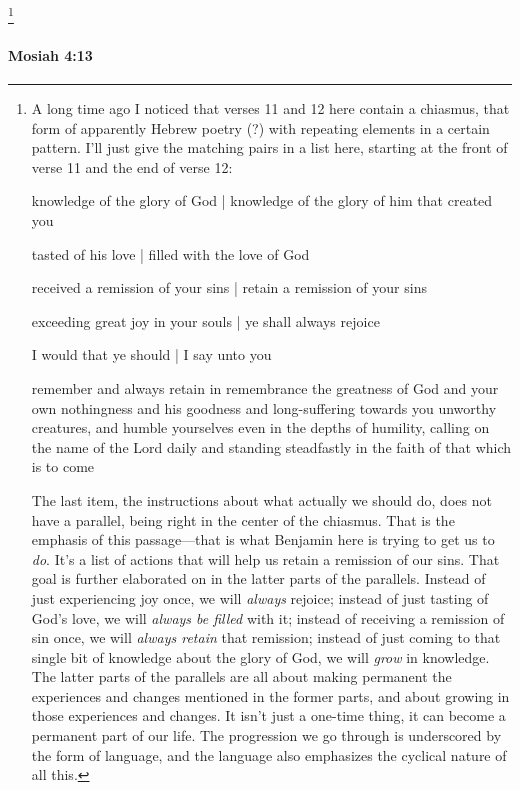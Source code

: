 				\footnote{%
					\label{MOSIAH-4-12-NOTE-chiasmus}%
					A long time ago I noticed that verses 11 and 12 here contain a chiasmus, that form of apparently Hebrew poetry (?) with repeating elements in a certain pattern. I'll just give the matching pairs in a list here, starting at the front of verse 11 and the end of verse 12:
						\begin{compactitem}
							\item knowledge of the glory of God | knowledge of the glory of him that created you
							\item tasted of his love | filled with the love of God
							\item received a remission of your sins | retain a remission of your sins
							\item exceeding great joy in your souls | ye shall always rejoice
							\item I would that ye should | I say unto you
							\item remember and always retain in remembrance the greatness of God and your own nothingness and his goodness and long-suffering towards you unworthy creatures, and humble yourselves even in the depths of humility, calling on the name of the Lord daily and standing steadfastly in the faith of that which is to come
						\end{compactitem}
					The last item, the instructions about what actually we should do, does not have a parallel, being right in the center of the chiasmus. That is the emphasis of this passage---that is what Benjamin here is trying to get us to \textit{do}. It's a list of actions that will help us retain a remission of our sins. That goal is further elaborated on in the latter parts of the parallels. Instead of just experiencing joy once, we will \textit{always} rejoice; instead of just tasting of God's love, we will \textit{always be filled} with it; instead of receiving a remission of sin once, we will \textit{always retain} that remission; instead of just coming to that single bit of knowledge about the glory of God, we will \textit{grow} in knowledge. The latter parts of the parallels are all about making permanent the experiences and changes mentioned in the former parts, and about growing in those experiences and changes. It isn't just a one-time thing, it can become a permanent part of our life. The progression we go through is underscored by the form of language, and the language also emphasizes the cyclical nature of all this.
					}

		\paragraph{Mosiah 4:13} %
			\label{MOSIAH-4-13}

